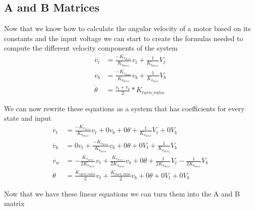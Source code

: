\documentclass{scrartcl}
\begin{document}
\subsection{A and B Matrices}
Now that we know how to calculate the angular velocity of a motor based on its constants and the input voltage we can start to create the formulas needed to compute the different velocity components of the system
\begin{align}
    \dot{v_t}    & = \frac{-K_{v_\mathit{drive}}}{K_{a_\mathit{drive}}}v_t + \frac{1}{K_{a_\mathit{drive}}}V_t \\
    \dot{v_b}    & = \frac{-K_{v_\mathit{drive}}}{K_{a_\mathit{drive}}}v_b + \frac{1}{K_{a_\mathit{drive}}}V_b \\
    \dot{\theta} & = \frac{v_t + v_b}{2} * K_\mathit{turn\_ratio}
\end{align}

We can now rewrite these equations as a system that has coefficients for every state and input
\begin{align}
    \dot{v_t}    & = \frac{-K_{v_\mathit{drive}}}{K_{a_\mathit{drive}}}v_t + 0v_b + 0\theta + \frac{1}{K_{a_\mathit{drive}}}V_t + 0V_b                                                                                  \\
    \dot{v_b}    & = 0v_t + \frac{-K_{v_\mathit{drive}}}{K_{a_\mathit{drive}}}v_b + 0\theta + 0V_t + \frac{1}{K_{a_\mathit{drive}}}V_b                                                                                  \\
    \dot{v_w}    & = -\frac{K_{v_\mathit{drive}}}{2K_{a_\mathit{drive}}}v_t + \frac{K_{v_\mathit{drive}}}{2K_{a_\mathit{drive}}}v_b + 0\theta + \frac{1}{2K_{a_\mathit{drive}}}V_t - \frac{1}{2K_{a_\mathit{drive}}}V_b \\
    \dot{\theta} & = \frac{K_\mathit{turn\_ratio}}{2}v_t + \frac{K_\mathit{turn\_ratio}}{2}v_b + 0\theta + 0V_t + 0V_b
\end{align}

Now that we have these linear equations we can turn them into the A and B matrix
\end{document}
